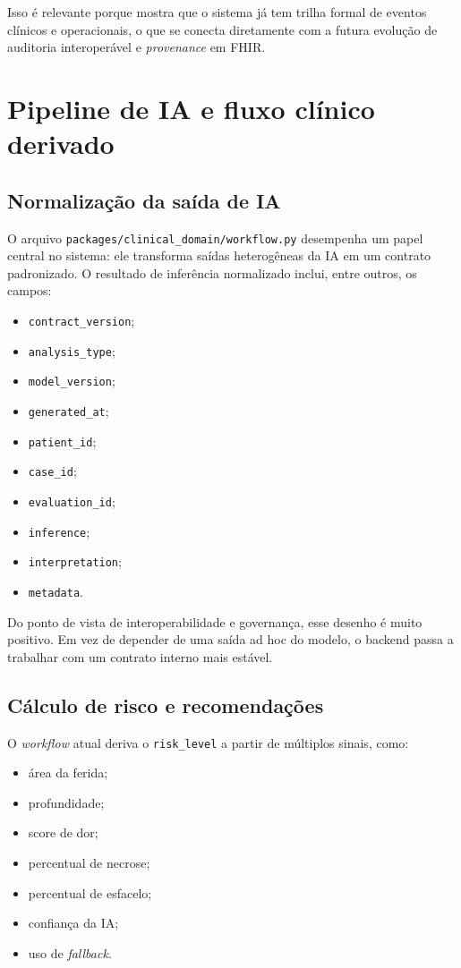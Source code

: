 \documentclass[
    12pt,
    openright,
    oneside,
    a4paper,
    chapter=TITLE,
    section=TITLE,
    brazil,
    sumario=tradicional,
    hidelinks
]{abntex2}
\begin{document}
Isso \'e relevante porque mostra que o sistema j\'a tem trilha formal de eventos cl\'inicos e operacionais, o que se conecta diretamente com a futura evolu\c{c}\~ao de auditoria interoper\'avel e \textit{provenance} em FHIR.

\chapter{Pipeline de IA e fluxo cl\'inico derivado}

\section{Normaliza\c{c}\~ao da sa\'ida de IA}

O arquivo \texttt{packages/clinical\_domain/workflow.py} desempenha um papel central no sistema: ele transforma sa\'idas heterog\^eneas da IA em um contrato padronizado. O resultado de infer\^encia normalizado inclui, entre outros, os campos:

\begin{itemize}
    \item \texttt{contract\_version};
    \item \texttt{analysis\_type};
    \item \texttt{model\_version};
    \item \texttt{generated\_at};
    \item \texttt{patient\_id};
    \item \texttt{case\_id};
    \item \texttt{evaluation\_id};
    \item \texttt{inference};
    \item \texttt{interpretation};
    \item \texttt{metadata}.
\end{itemize}

Do ponto de vista de interoperabilidade e governan\c{c}a, esse desenho \'e muito positivo. Em vez de depender de uma sa\'ida ad hoc do modelo, o backend passa a trabalhar com um contrato interno mais est\'avel.

\section{C\'alculo de risco e recomenda\c{c}\~oes}

O \textit{workflow} atual deriva o \texttt{risk\_level} a partir de m\'ultiplos sinais, como:

\begin{itemize}
    \item \'area da ferida;
    \item profundidade;
    \item score de dor;
    \item percentual de necrose;
    \item percentual de esfacelo;
    \item confian\c{c}a da IA;
    \item uso de \textit{fallback}.
\end{itemize}
\end{document}
